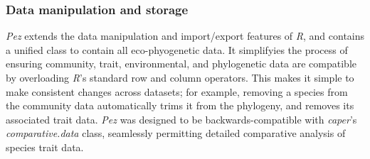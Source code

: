 \documentclass[11pt]{article} %
\begin{document}
\subsubsection*{Data manipulation and storage}
\emph{Pez} extends the data manipulation and import/export features of
\emph{R}, and contains a unified class to contain all eco-phyogenetic
data. It simplifyies the process of ensuring community, trait,
environmental, and phylogenetic data are compatible by overloading
\emph{R}'s standard row and column operators. This makes it simple to
make consistent changes across datasets; for example, removing a
species from the community data automatically trims it from the
phylogeny, and removes its associated trait data. \emph{Pez} was
designed to be backwards-compatible with \emph{caper}'s
\autocite{Orme2013} \emph{comparative.data} class, seamlessly permitting detailed
comparative analysis of species trait data.
\end{document}
